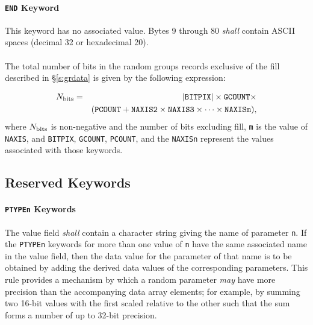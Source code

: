 \documentclass[11pt,makeidx]{book}     %
\begin{document}
   \paragraph{{\tt END} Keyword}
   This keyword has no associated value.  Bytes 9 through 80
   {\em shall} contain ASCII spaces (decimal 32 or hexadecimal 20).

 \paragraph{} The total number of bits in the random groups records 
 exclusive of the fill described in \S\ref{s:grdata} is
 given by the following
 expression:

\begin{eqnarray}  
   \mbox{$N_{\rm bits}$} &=&  
                     |\mbox{{\tt BITPIX}}| \times 
                     \mbox{{\tt GCOUNT}} \times \nonumber \\
                & &  (\mbox{{\tt PCOUNT}} + \mbox{{\tt NAXIS2}} \times 
                 \mbox{{\tt NAXIS3}} \times  \cdots 
                 \times \mbox{{\tt NAXISm}}),  \label{eq:rdmgsz}
\end{eqnarray}
\noindent
 where $N_{\rm bits}$ is
 non-negative and the number of bits excluding fill, 
 {\tt m} is the value of {\tt NAXIS}, and 
 {\tt BITPIX}, {\tt GCOUNT}, 
 {\tt PCOUNT}, and the {\tt NAXISn}
 represent
 the values associated with those keywords.          
 
  \subsection{Reserved Keywords}
  \label{s:rgrrk}   
   \paragraph{{\tt PTYPEn} Keywords}
    \label{s:ptyp}
   The value field {\em shall} contain a character string 
   giving
   the name of parameter {\tt n}.  If the {\tt PTYPEn} 
   keywords for more than one value of {\tt n} have the same associated 
   name in the value field, then the data value for the parameter 
   of that name is to be obtained by adding the derived data values 
   of the corresponding parameters.  This rule provides a mechanism by
   which a random parameter {\em may} have more precision than the
   accompanying data array elements; for example, by summing two 16-bit
   values with the first scaled relative to the other such that the
   sum forms a number of up to 32-bit precision. 
 
\end{document}
